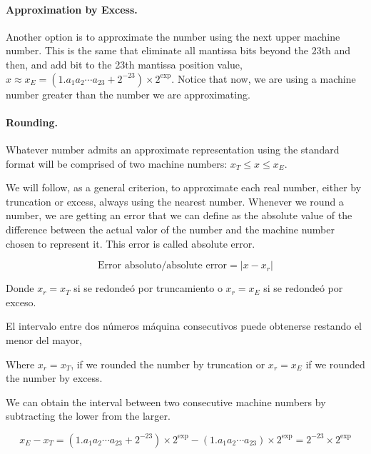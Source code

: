 \begin{paracol}{2}
\paragraph{Approximation by Excess.} Another option is to approximate the number using the next upper machine number. This is the same that eliminate all mantissa bits beyond the 23th and then, and add bit to the 23th mantissa position value, $x\approx x_E=  (1.a_1a_2\cdots a_{23}+2^{-23})\times2^{\text{exp}}$. Notice that now, we are using a machine number greater than the number we are approximating.

\paragraph{Rounding.} Whatever number admits an approximate representation using the standard format will be comprised of two machine numbers: $x_T\leq x\leq x_E$. 

We will follow, as a general criterion, to approximate each real number, either by truncation or excess, always using the nearest number. Whenever we round a number, we are getting an error that we can define as the absolute value of the difference between the actual valor of the number and the machine number chosen to represent it. This error is called absolute error. 


\end{paracol}
\begin{equation*}
\text{Error absoluto/absolute error}=\vert x-x_r\vert
\end{equation*}

\begin{paracol}{2}
Donde $x_r=x_T$ si se redondeó por truncamiento o $x_r=x_E$ si se redondeó por exceso.

El intervalo entre dos números máquina consecutivos puede obtenerse restando el menor del mayor,

\switchcolumn
Where $x_r=x_T$, if we rounded the number by truncation or $x_r=x_E$ if we rounded the number by excess.

We can obtain the interval between two consecutive machine numbers by subtracting the lower from the larger. 
\end{paracol}

\begin{equation*}
x_E-x_T= (1.a_1a_2\cdots a_{23}+2^{-23})\times2^\text{exp}- (1.a_1a_2\cdots a_{23})\times2^{\text{exp}}=2^{-23}\times 2^\text{exp}
\end{equation*}

